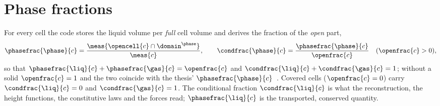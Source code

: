 \section{Phase fractions}\label{sec:interface:fractions}
For every cell the code stores the liquid volume per \emph{full} cell volume
and derives the fraction of the \emph{open} part,
\begin{equation}\label{eq:interface:fractions}
  \phasefrac{\phase}{c}=\frac{\meas{\opencell{c}\cap\domain^{\phase}}}{\meas{c}},\qquad
  \condfrac{\phase}{c}=\frac{\phasefrac{\phase}{c}}{\openfrac{c}}\quad(\openfrac{c}>0),
\end{equation}
so that $\phasefrac{\liq}{c}+\phasefrac{\gas}{c}=\openfrac{c}$ and
$\condfrac{\liq}{c}+\condfrac{\gas}{c}=1$; without a solid
$\openfrac{c}=1$ and the two coincide with the thesis'
$\phasefrac{\phase}{c}$~. Covered cells ($\openfrac{c}=0$)
carry $\condfrac{\liq}{c}=0$ and $\condfrac{\gas}{c}=1$. The conditional fraction $\condfrac{\liq}{c}$
is what the reconstruction, the height functions, the constitutive laws and
the forces read; $\phasefrac{\liq}{c}$ is the transported, conserved quantity.

